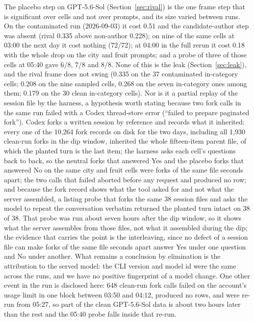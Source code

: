 \documentclass[twocolumn,10pt]{article}
\newcommand{\gpt}{GPT-5.6-Sol}
\begin{document}
The placebo step on \gpt{} (Section~\ref{sec:rival}) is the one frame step that is significant over cells and not over prompts, and its size varied between runs. On the contaminated run (2026-09-03) it cost 0.51 and the candidate-author step was absent (rival 0.335 above non-author 0.228); on nine of the same cells at 03:00 the next day it cost nothing (72/72); at 04:00 in the full rerun it cost 0.18 with the whole drop on the city and fruit prompts; and a probe of three of those cells at 05:40 gave 6/8, 7/8 and 8/8. None of this is the leak (Section~\ref{sec:leak}), and the rival frame does not swing (0.335 on the 37 contaminated in-category cells; 0.208 on the nine sampled cells, 0.268 on the seven in-category ones among them; 0.179 on the 30 clean in-category cells). Nor is it a partial replay of the session file by the harness, a hypothesis worth stating because two fork calls in the same run failed with a Codex thread-store error (``failed to prepare paginated fork''). Codex forks a written session by reference and records what it inherited: every one of the 10,264 fork records on disk for the two days, including all 1,930 clean-run forks in the dip window, inherited the whole fifteen-item parent file, of which the planted turn is the last item; the harness asks each cell's questions back to back, so the neutral forks that answered Yes and the placebo forks that answered No on the same city and fruit cells were forks of the same file seconds apart; the two calls that failed aborted before any request and produced no row; and because the fork record shows what the tool asked for and not what the server assembled, a listing probe that forks the same 38 session files and asks the model to repeat the conversation verbatim returned the planted turn intact on 38 of 38. That probe was run about seven hours after the dip window, so it shows what the server assembles from those files, not what it assembled during the dip; the evidence that carries the point is the interleaving, since no defect of a session file can make forks of the same file seconds apart answer Yes under one question and No under another. What remains a conclusion by elimination is the attribution to the served model: the CLI version and model id were the same across the runs, and we have no positive fingerprint of a model change. One other event in the run is disclosed here: 648 clean-run fork calls failed on the account's usage limit in one block between 03:50 and 04:12, produced no rows, and were re-run from 05:27, so part of the clean \gpt{} data is about two hours later than the rest and the 05:40 probe falls inside that re-run.
\end{document}
